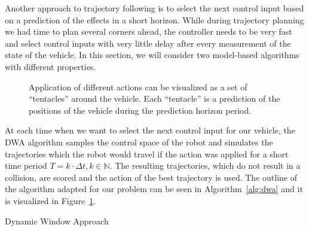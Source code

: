 Another approach to trajectory following is to select the next control input based on a prediction of the effects in a short horizon. While during trajectory planning we had time to plan several corners ahead, the controller needs to be very fast and select control inputs with very little delay after every measurement of the state of the vehicle. In this section, we will consider two model-based algorithms with different properties.

\begin{figure}
	\caption{Application of different actions can be visualized as a set of ``tentacles'' around the vehicle. Each ``tentacle'' is a prediction of the positions of the vehicle during the prediction horizon period.}
	\label{fig:dwa}
\end{figure}

At each time when we want to select the next control input for our vehicle, the DWA algorithm \cite{DWA} samples the control space of the robot and simulates the trajectories which the robot would travel if the action was applied for a short time period $T=k\cdot \Delta t,k\in\mathbb{N}$. The resulting trajectories, which do not result in a collision, are scored and the action of the best trajectory is used. The outline of the algorithm adapted for our problem can be seen in Algorithm~\ref{alg:dwa} and it is visualized in Figure~\ref{fig:dwa}.

\begin{algorithm}[]
	\SetAlgoLined
	\DontPrintSemicolon
	
	
	
	
	\BlankLine
	
		
	\caption{Dynamic Window Approach}
	\label{alg:dwa}
\end{algorithm}

